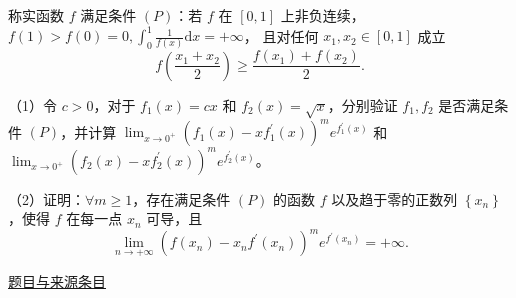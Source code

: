 \documentclass[UTF8,12pt,a4paper,fontset=fandol]{ctexart}
\begin{document}
\begin{example}[来源序号7]\label{ex:fin12-high:7}\label{pr:fin12-high:7}

称实函数 $f$ 满足条件 $(P)$：若 $f$ 在 $[0,1]$ 上非负连续，
$f(1)>f(0)=0,\int_{0}^{1}\frac{1}{f(x)}\mathrm{d}x=+\infty$，
且对任何 $x_{1},x_{2}\in[0,1]$ 成立
\[
f\left(\frac{x_{1}+x_{2}}{2}\right)\geq\frac{f\left(x_{1}\right)+f\left(x_{2}\right)}{2}.
\]

（1）令 $c>0$，对于 $f_{1}(x)=cx$ 和 $f_{2}(x)=\sqrt{x}$，分别验证 $f_{1},f_{2}$ 是否满足条件 $(P)$，并计算
$\lim_{x\to 0^{+}}\left(f_{1}(x)-xf_{1}^{\prime}(x)\right)^{m}e^{f_{1}^{\prime}(x)}$ 和 $\lim_{x\to 0^{+}}\left(f_{2}(x)-xf_{2}^{\prime}(x)\right)^{m}e^{f_{2}^{\prime}(x)}$。

（2）证明：$\forall m\geq 1$，存在满足条件 $(P)$ 的函数 $f$ 以及趋于零的正数列 $\left\{x_{n}\right\}$，使得 $f$ 在每一点 $x_{n}$ 可导，且
\[
\lim_{n\to+\infty}\left(f\left(x_{n}\right)-x_{n}f^{\prime}\left(x_{n}\right)\right)^{m}e^{f^{\prime}\left(x_{n}\right)}=+\infty.
\]

\par\href{https://github.com/lzxcr/cmc-mathematics/blob/64916fa1fdbc3e444a652eca204d5669058ee321/src/problems/finals/12/07.md}{题目与来源条目}

\end{example}
\end{document}
